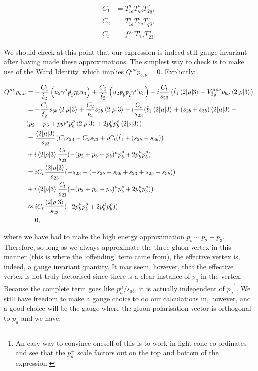 \begin{subequations}
\begin{align}
C_1 &= T^g_{1a} T^b_{q3}T^g_{2q}, \\
C_2 &= T^g_{1a} T^b_{2q}T^g_{q3}, \\
C_t &= f^{gbc}T^c_{1a}T^g_{23}.
\end{align}
\end{subequations}

We should check at this point that our expression is indeed still gauge invariant after having made these approximations. The simplest way to check is to make use of the Ward Identity, which implies $Q^{\mu \nu} p_{b, \nu} = 0$. Explicitly; 

\begin{equation}
\begin{split}
Q^{\mu \nu}p_{b, \nu} &= -\frac{C_1}{\hat{t}_2} \left(\bar{u}_2 \gamma^\mu \slashed{p}_3 \slashed{p_b} u_3 \right) + \frac{C_2}{\tilde{t}_2} \left( \bar{u}_2 \slashed{p}_b \slashed{p}_2 \gamma^\mu u_3 \right) + i  \frac{C_t}{s_{23}} \left(\hat{t}_1  \mathinner{\langle2\vert\mu\vert3\rangle}_{} + V^{\mu \rho \nu}_{3g}p_{b \nu}  \mathinner{\langle2\vert\rho\vert3\rangle}_{} \right) \\
&= -\frac{C_1}{\hat{t}_2} s_{3b} \mathinner{\langle2\vert\mu\vert3\rangle}_{} + \frac{C_2}{\tilde{t}_2} s_{2b} \mathinner{\langle2\vert\mu\vert3\rangle}_{} + i \frac{C_t}{s_{23}}(\hat{t}_1 \mathinner{\langle2\vert\mu\vert3\rangle}_{} + (s_{2b} + s_{3b})\mathinner{\langle2\vert\mu\vert3\rangle}_{} - \\
&(p_2+p_3+p_b)^\mu p_b^\rho\mathinner{\langle2\vert\rho\vert3\rangle}_{} + 2p_b^\mu p_b^\rho \mathinner{\langle2\vert\rho\vert3\rangle}_{}) \\
&= \frac{\mathinner{\langle2\vert\mu\vert3\rangle}_{}}{s_{23}}(C_1 s_{23} - C_2 s_{23} + i C_t(\hat{t}_1 + (s_{2b} + s_{3b})) \\
&+ i\mathinner{\langle2\vert\rho\vert3\rangle}_{} \frac{C_t}{s_{23}}(-(p_2+p_3+p_b)^\mu p_b^\rho + 2p_b^\mu p_b^\rho) \\
&= i C_t \frac{\mathinner{\langle2\vert\mu\vert3\rangle}_{}}{s_{23}}(-s_{23} + (-s_{2b} - s_{3b} + s_{23} + s_{2b} + s_{3b})) \\
&+i\mathinner{\langle2\vert\rho\vert3\rangle}_{} \frac{C_t}{s_{23}}(-(p_2+p_3+p_b)^\mu p_b^\rho + 2p_b^\mu p_b^\rho)) \\
&\approx  i C_t \frac{\mathinner{\langle2\vert\rho\vert3\rangle}_{}}{s_{23}}(-2p_b^\mu p_b^\rho + 2p_b^\mu p_b^\rho)) \\
&= 0,
\end{split}
\end{equation}

where we have had to make the high energy approximation $p_b \sim p_2 + p_3$. Therefore, so long as we always approximate the three gluon vertex in this manner (this is where the `offending' term came from), the effective vertex is, indeed, a gauge invariant quantity. It may seem, however, that the effective vertex is not truly factorised since there is a clear instance of $p_a$ in the vertex. Because the complete term goes like $p_a^\mu/s_{ab}$, it is actually independent of $p_a$\footnote{An easy way to convince oneself of this is to work in light-cone co-ordinates and see that the $p_a^+$ scale factors out on the top and bottom of the expression.}. We still have freedom to make a gauge choice to do our calculations in, however, and a good choice will be the gauge where the gluon polarisation vector is orthogonal to $p_a$ and we have;

